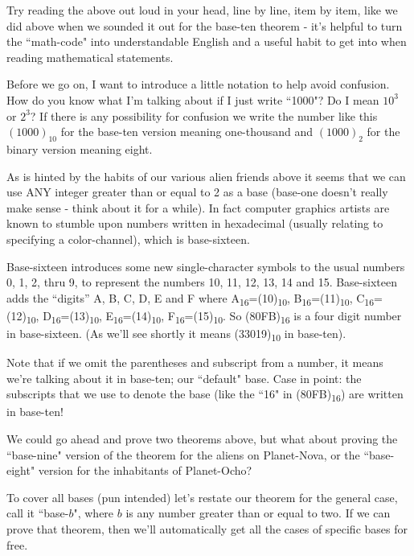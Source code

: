 \documentclass{article}
\begin{document}
Try reading the above out loud in your head,
line by line, item by item, like we did above when
we sounded it out for the base-ten theorem - it's
helpful to turn the ``math-code" into understandable
English and a useful habit to get into when reading mathematical statements.

Before we go on,
I want to introduce a little notation to help avoid confusion.
How do you know what I'm talking about if I just
write ``1000"? Do I mean $10^3$ or $2^3$?
If there is any possibility for confusion we write
the number like this $(1000)_{10}$ 
for the base-ten version meaning one-thousand and $(1000)_2$
for the binary version meaning eight.

As is hinted by the habits of our various alien friends
above it seems that we can use ANY integer greater than
or equal to 2 as a base (base-one doesn't really make
sense - think about it for a while).
In fact computer graphics artists are known
to stumble upon numbers written in hexadecimal (usually relating to specifying a color-channel),
which is base-sixteen.

Base-sixteen introduces some new single-character symbols to the usual numbers 0, 1,
2, thru 9,
to represent the numbers 10, 11, 12, 13, 14 and 15.
Base-sixteen adds the ``digits'' A, B, C, D, E and F where
A\textsubscript{16}=(10)\textsubscript{10},
B\textsubscript{16}=(11)\textsubscript{10},
C\textsubscript{16}=(12)\textsubscript{10},
D\textsubscript{16}=(13)\textsubscript{10},
E\textsubscript{16}=(14)\textsubscript{10},
F\textsubscript{16}=(15)\textsubscript{10}.
So (80FB)\textsubscript{16} is a four digit number in base-sixteen. (As we'll see shortly it means (33019)\textsubscript{10} in base-ten).

Note that if we omit the parentheses and subscript from a number,
it means we're talking about it in base-ten; our ``default" base.
Case in point: the subscripts that we use to denote the base
(like the ``16" in (80FB)\textsubscript{16}) are written in base-ten!

We could go ahead and prove two theorems above,
but what about proving the ``base-nine" version of the theorem for the aliens on Planet-Nova,
or the ``base-eight" version for the inhabitants of Planet-Ocho?

To cover all bases (pun intended) let's restate our theorem for the general case,
call it ``base-$b$",
where $b$ is any number greater than or equal to two.
If we can prove that theorem,
then we'll automatically get all the cases of specific bases for free.
\end{document}
